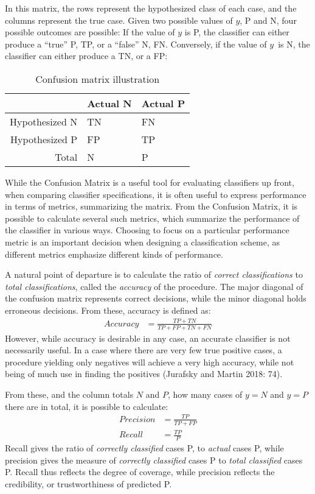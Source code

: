 \documentclass[12pt,twoside]{reedthesis}
\begin{document}
In this matrix, the rows represent the hypothesized class of each case,
and the columns represent the true case. Given two possible values of
\(y\), P and N, four possible outcomes are possible: If the value of
\(y\) is P, the classifier can either produce a ``true'' P, TP, or a
``false'' N, FN. Conversely, if the value of \(y\)~is N, the classifier
can either produce a TN, or a FP:
\begin{table}[ht]
\centering
\begin{tabular}{rll}
  \hline
 & Actual N & Actual P \\ 
  \hline
Hypothesized N & TN & FN \\ 
  Hypothesized P & FP & TP \\ 
  Total & N & P \\ 
   \hline
\end{tabular}
\caption{Confusion matrix illustration} 
\end{table}
While the Confusion Matrix is a useful tool for evaluating classifiers
up front, when comparing classifier specifications, it is often useful
to express performance in terms of metrics, summarizing the matrix. From
the Confusion Matrix, it is possible to calculate several such metrics,
which summarize the performance of the classifier in various ways.
Choosing to focus on a particular performance metric is an important
decision when designing a classification scheme, as different metrics
emphasize different kinds of performance.

A natural point of departure is to calculate the ratio of \emph{correct
classifications} to \emph{total classifications}, called the
\emph{accuracy} of the procedure. The major diagonal of the confusion
matrix represents correct decisions, while the minor diagonal holds
erroneous decisions. From these, accuracy is defined as:
\begin{align*}
Accuracy &= \frac{TP + TN}{TP + FP + TN + FN}
\end{align*}
However, while accuracy is desirable in any case, an accurate classifier
is not necessarily useful. In a case where there are very few true
positive cases, a procedure yielding only negatives will achieve a very
high accuracy, while not being of much use in finding the positives
(Jurafsky and Martin 2018: 74).

From these, and the column totals \(N\) and \(P\), how many cases of
\(y=N\) and \(y=P\) there are in total, it is possible to calculate:
\begin{align*}
 Precision &= \frac{TP}{TP + FP}\\
 Recall &= \frac{TP}{P}
\end{align*}
Recall gives the ratio of \emph{correctly classified} cases P, to
\emph{actual} cases P, while precision gives the measure of
\emph{correctly classified} cases P to \emph{total classified} cases P.
Recall thus reflects the degree of coverage, while precision reflects
the credibility, or trustworthiness of predicted P.
\end{document}
